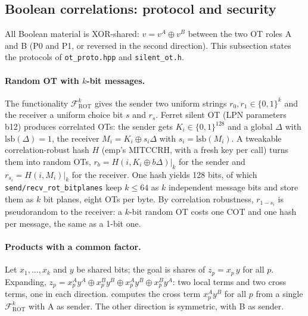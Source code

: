 \subsection{Boolean correlations: protocol and security}\label{sec:otformal}

All Boolean material is XOR-shared: $v = v^A \oplus v^B$ between the two OT roles A and B (P0 and P1, or reversed in
the second direction). This subsection states the protocols of \texttt{ot\_proto.hpp} and \texttt{silent\_ot.h}.

\paragraph{Random OT with $k$-bit messages.} The functionality $\mathcal{F}^{k}_{\mathrm{ROT}}$ gives the sender two
uniform strings $r_0, r_1 \in \{0,1\}^k$ and the receiver a uniform choice bit $s$ and $r_s$. Ferret silent OT
(LPN parameters b12) produces correlated OTs: the sender gets $K_i \in \{0,1\}^{128}$ and a global $\Delta$ with
$\mathrm{lsb}(\Delta) = 1$, the receiver $M_i = K_i \oplus s_i\Delta$ with $s_i = \mathrm{lsb}(M_i)$. A tweakable
correlation-robust hash $H$ (emp's MITCCRH, with a fresh key per call) turns them into random OTs,
$r_b = H(i, K_i \oplus b\Delta)|_k$ for the sender and $r_{s_i} = H(i, M_i)|_k$ for the receiver. One hash yields 128
bits, of which \texttt{send/recv\_rot\_bitplanes} keep $k \le 64$ as $k$ independent message bits and store them as
$k$ bit planes, eight OTs per byte. By correlation robustness, $r_{1-s_i}$ is pseudorandom to the receiver: a
$k$-bit random OT costs one COT and one hash per message, the same as a 1-bit one.

\paragraph{Products with a common factor.} Let $x_1, \ldots, x_k$ and $y$ be shared bits; the goal is shares of
$z_p = x_p\, y$ for all $p$. Expanding,
$z_p = x_p^A y^A \oplus x_p^B y^B \oplus x_p^A y^B \oplus x_p^B y^A$: two local terms and two cross terms, one in each
direction.  computes the cross term $x_p^A y^B$ for all $p$ from a single $\mathcal{F}^{k}_{\mathrm{ROT}}$
with A as sender. The other direction is symmetric, with B as sender.

